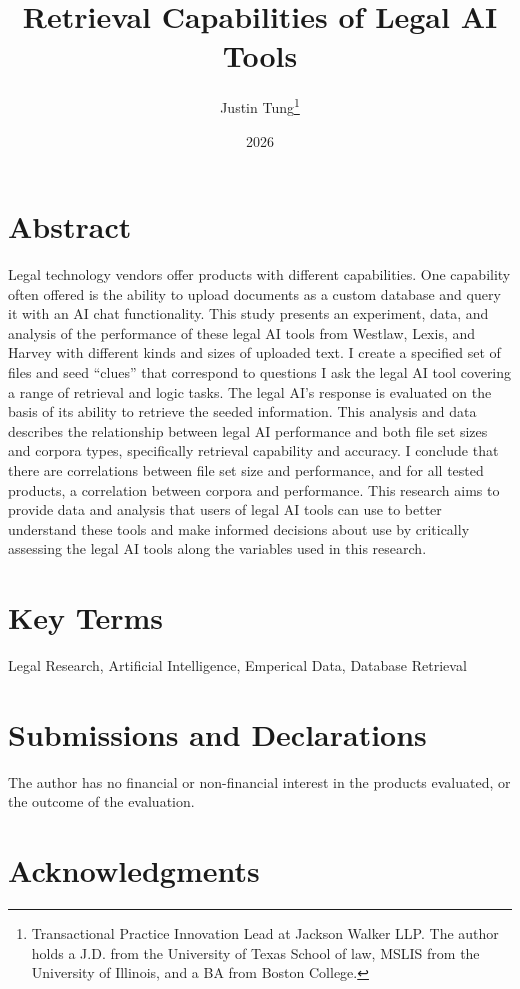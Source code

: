 \documentclass[
]{article}
\title{Retrieval Capabilities of Legal AI Tools}
\author{Justin Tung\footnote{Transactional Practice Innovation Lead at
  Jackson Walker LLP. The author holds a J.D. from the University of
  Texas School of law, MSLIS from the University of Illinois, and a BA
  from Boston College.}}
\date{2026}
\begin{document}
\maketitle

{
\setcounter{tocdepth}{3}
\tableofcontents
}
\section{Abstract}\label{abstract}

Legal technology vendors offer products with different capabilities. One
capability often offered is the ability to upload documents as a custom
database and query it with an AI chat functionality. This study presents
an experiment, data, and analysis of the performance of these legal AI
tools from Westlaw, Lexis, and Harvey with different kinds and sizes of
uploaded text. I create a specified set of files and seed ``clues'' that
correspond to questions I ask the legal AI tool covering a range of
retrieval and logic tasks. The legal AI's response is evaluated on the
basis of its ability to retrieve the seeded information. This analysis
and data describes the relationship between legal AI performance and
both file set sizes and corpora types, specifically retrieval capability
and accuracy. I conclude that there are correlations between file set
size and performance, and for all tested products, a correlation between
corpora and performance. This research aims to provide data and analysis
that users of legal AI tools can use to better understand these tools
and make informed decisions about use by critically assessing the legal
AI tools along the variables used in this research.

\section{Key Terms}\label{key-terms}

Legal Research, Artificial Intelligence, Emperical Data, Database
Retrieval

\section{Submissions and
Declarations}\label{submissions-and-declarations}

The author has no financial or non-financial interest in the products
evaluated, or the outcome of the evaluation.

\section{Acknowledgments}\label{acknowledgments}
\end{document}
